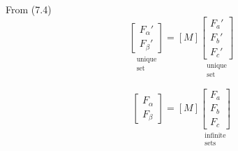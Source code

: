 \documentclass[a4paper,numbers=noenddot,12pt]{scrbook}
\begin{document}
From (7.4)
\begin{equation}
    \underset{\substack{\text{unique}\\ \text{set}}}
    {\begin{bmatrix}
        F_{\alpha}' \\ F_{\beta}'
    \end{bmatrix}}
    =
    [M]
    \underset{\substack{\text{unique} \\ \text{set}}}
    {\begin{bmatrix}
        F_a' \\ F_b' \\ F_c'
    \end{bmatrix}}
    \label{eq:Eq7.5}
\end{equation}

\begin{equation}
    \begin{bmatrix}
        F_{\alpha} \\ F_{\beta}
    \end{bmatrix}
    =
    [M]
    \underset{\substack{\text{infinite} \\ \text{sets}}}
    {\begin{bmatrix}
        F_a \\ F_b \\ F_c
    \end{bmatrix}}
    \label{eq:Eq7.6}
\end{equation}
\end{document}

